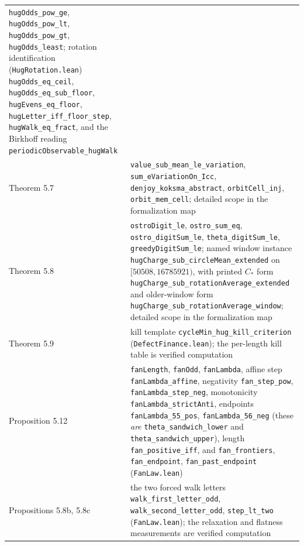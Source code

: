 \documentclass[12pt]{article}
\begin{document}
\begin{longtable}[]{@{}
  >{\raggedright\arraybackslash}p{}
  >{\raggedright\arraybackslash}p{}@{}}
\texttt{\nolinkurl{hugOdds_pow_ge}},
\texttt{\nolinkurl{hugOdds_pow_lt}},
\texttt{\nolinkurl{hugOdds_pow_gt}}, \texttt{\nolinkurl{hugOdds_least}};
rotation identification (\texttt{\nolinkurl{HugRotation.lean}})
\texttt{\nolinkurl{hugOdds_eq_ceil}},
\texttt{\nolinkurl{hugOdds_eq_sub_floor}},
\texttt{\nolinkurl{hugEvens_eq_floor}},
\texttt{\nolinkurl{hugLetter_iff_floor_step}},
\texttt{\nolinkurl{hugWalk_eq_fract}}, and the Birkhoff reading
\texttt{\nolinkurl{periodicObservable_hugWalk}} \\
Theorem 5.7 & \texttt{\nolinkurl{value_sub_mean_le_variation}},
\texttt{\nolinkurl{sum_eVariationOn_Icc}},
\texttt{\nolinkurl{denjoy_koksma_abstract}},
\texttt{\nolinkurl{orbitCell_inj}}, \texttt{\nolinkurl{orbit_mem_cell}};
detailed scope in the formalization map \\
Theorem 5.8 & \texttt{\nolinkurl{ostroDigit_le}},
\texttt{\nolinkurl{ostro_sum_eq}},
\texttt{\nolinkurl{ostro_digitSum_le}},
\texttt{\nolinkurl{theta_digitSum_le}},
\texttt{\nolinkurl{greedyDigitSum_le}}; named window instance
\texttt{\nolinkurl{hugCharge_sub_circleMean_extended}} on
\([50508,16785921)\), with printed \(C_*\) form
\texttt{\nolinkurl{hugCharge_sub_rotationAverage_extended}} and
older-window form
\texttt{\nolinkurl{hugCharge_sub_rotationAverage_window}}; detailed
scope in the formalization map \\
Theorem 5.9 & kill template
\texttt{\nolinkurl{cycleMin_hug_kill_criterion}}
(\texttt{\nolinkurl{DefectFinance.lean}}); the per-length kill table is
verified computation \\
Proposition 5.12 & \texttt{\nolinkurl{fanLength}},
\texttt{\nolinkurl{fanOdd}}, \texttt{\nolinkurl{fanLambda}}, affine step
\texttt{\nolinkurl{fanLambda_affine}}, negativity
\texttt{\nolinkurl{fan_step_pow}},
\texttt{\nolinkurl{fanLambda_step_neg}}, monotonicity
\texttt{\nolinkurl{fanLambda_strictAnti}}, endpoints
\texttt{\nolinkurl{fanLambda_55_pos}},
\texttt{\nolinkurl{fanLambda_56_neg}} (these \emph{are}
\texttt{\nolinkurl{theta_sandwich_lower}} and
\texttt{\nolinkurl{theta_sandwich_upper}}), length
\texttt{\nolinkurl{fan_positive_iff}}, and
\texttt{\nolinkurl{fan_frontiers}}, \texttt{\nolinkurl{fan_endpoint}},
\texttt{\nolinkurl{fan_past_endpoint}}
(\texttt{\nolinkurl{FanLaw.lean}}) \\
Propositions 5.8b, 5.8c & the two forced walk letters
\texttt{\nolinkurl{walk_first_letter_odd}},
\texttt{\nolinkurl{walk_second_letter_odd}},
\texttt{\nolinkurl{step_lt_two}} (\texttt{\nolinkurl{FanLaw.lean}}); the
relaxation and flatness measurements are verified computation \\

\end{longtable}
\end{document}
